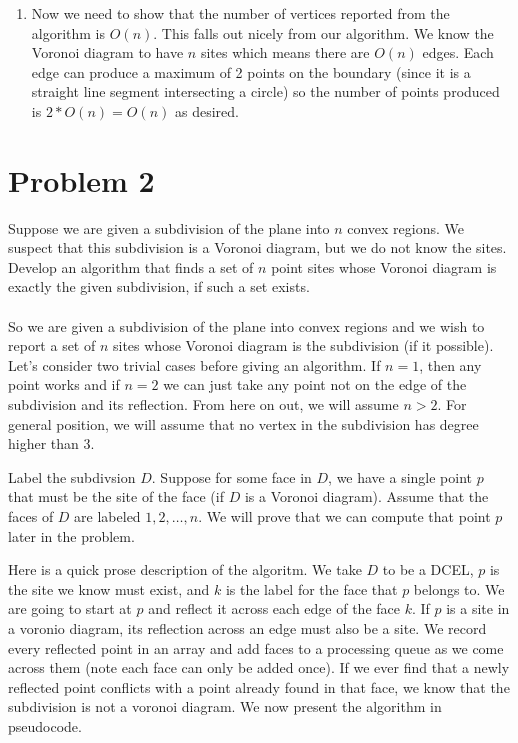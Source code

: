 \documentclass[11pt]{article}
\begin{document}
\begin{enumerate}
    \item Now we need to show that the number of vertices reported from the algorithm is $O(n)$.
    This falls out nicely from our algorithm.
    We know the Voronoi diagram to have $n$ sites which means there are $O(n)$ edges.
    Each edge can produce a maximum of 2 points on the boundary (since it is a straight line segment intersecting a circle) so the number of points produced is $2*O(n) = O(n)$ as desired.
\end{enumerate}

\newpage
\section*{Problem 2}

Suppose we are given a subdivision of the plane into $n$ convex regions. We
suspect that this subdivision is a Voronoi diagram, but we do not know the
sites. Develop an algorithm that finds a set of $n$ point sites whose Voronoi
diagram is exactly the given subdivision, if such a set exists. \\\\

\answer
So we are given a subdivision of the plane into convex regions and we wish to report a set of $n$ sites whose Voronoi diagram is the subdivision (if it possible).
Let's consider two trivial cases before giving an algorithm.
If $n=1$, then any point works and if $n=2$ we can just take any point not on the edge of the subdivision and its reflection.
From here on out, we will assume $n > 2$.
For general position, we will assume that no vertex in the subdivision has degree higher than 3.

Label the subdivsion $D$.
Suppose for some face in $D$, we have a single point $p$ that must be the site of the face (if $D$ is a Voronoi diagram).
Assume that the faces of $D$ are labeled $1, 2, \ldots, n$.
We will prove that we can compute that point $p$ later in the problem.

Here is a quick prose description of the algoritm.
We take $D$ to be a DCEL, $p$ is the site we know must exist, and $k$ is the label for the face that $p$ belongs to.
We are going to start at $p$ and reflect it across each edge of the face $k$.
If $p$ is a site in a voronio diagram, its reflection across an edge must also be a site.
We record every reflected point in an array and add faces to a processing queue as we come across them (note each face can only be added once).
If we ever find that a newly reflected point conflicts with a point already found in that face, we know that the subdivision is not a voronoi diagram.
We now present the algorithm in pseudocode.
\end{document}
